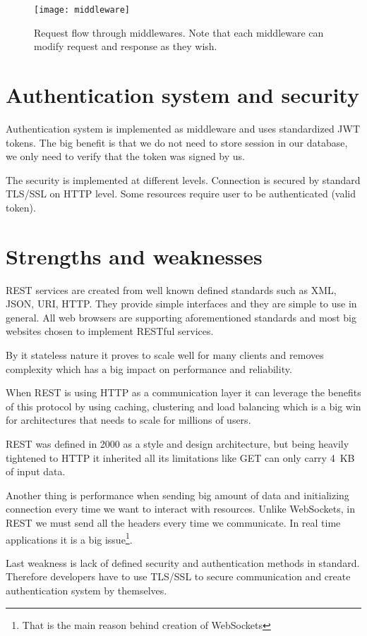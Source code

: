 \begin{figure}[!htbp]
\centering
\texttt{[image: middleware]}
\caption[Request flow through middlewares]{Request flow through middlewares. Note that each middleware can modify request and response as they wish.}
\label{fig:middleware}
\end{figure}

\section{Authentication system and security}
Authentication system is implemented as middleware and uses standardized JWT tokens\cite{JWT-rfc}. The big benefit is that we do not need to store session in our database, we only need to verify that the token was signed by us.

The security is implemented at different levels. Connection is secured by standard TLS/SSL on HTTP level. Some resources require user to be authenticated (valid token).


\section{Strengths and weaknesses}
REST services are created from well known defined standards such as XML, JSON, URI, HTTP\@. They provide simple interfaces and they are simple to use in general. All web browsers are supporting aforementioned standards and most big websites chosen to implement RESTful services.

By it stateless nature it proves to scale well for many clients and removes complexity which has a big impact on performance and reliability.

When REST is using HTTP as a communication layer it can leverage the benefits of this protocol by using caching, clustering and load balancing which is a big win for architectures that needs to scale for millions of users.

REST was defined in 2000\cite{REST-wiki} as a style and design architecture, but being heavily tightened to HTTP it inherited all its limitations like GET can only carry 4~KB of input data\cite[p.~3]{restful-web-services}.

Another thing is performance when sending big amount of data and initializing connection every time we want to interact with resources. Unlike WebSockets, in REST we must send all the headers every time we communicate. In real time applications it is a big issue\footnote{That is the main reason behind creation of WebSockets}.

Last weakness is lack of defined security and authentication methods in standard. Therefore developers have to use TLS/SSL to secure communication and create authentication system by themselves.
